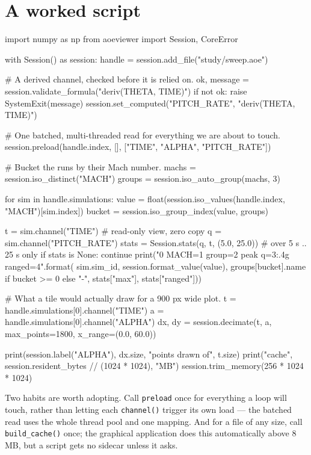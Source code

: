 \documentclass[11pt,a4paper,oneside]{report}
\newcommand{\code}[1]{\texttt{#1}}
\begin{document}
\section{A worked script}

\begin{aoecode}
import numpy as np
from aoeviewer import Session, CoreError

with Session() as session:
    handle = session.add_file("study/sweep.aoe")

    # A derived channel, checked before it is relied on.
    ok, message = session.validate_formula("deriv(THETA, TIME)")
    if not ok:
        raise SystemExit(message)
    session.set_computed("PITCH_RATE", "deriv(THETA, TIME)")

    # One batched, multi-threaded read for everything we are about to touch.
    session.preload(handle.index, [], ["TIME", "ALPHA", "PITCH_RATE"])

    # Bucket the runs by their Mach number.
    machs = session.iso_distinct("MACH")
    groups = session.iso_auto_group(machs, 3)

    for sim in handle.simulations:
        value = float(session.iso_values(handle.index, "MACH")[sim.index])
        bucket = session.iso_group_index(value, groups)

        t = sim.channel("TIME")           # read-only view, zero copy
        q = sim.channel("PITCH_RATE")
        stats = Session.stats(q, t, (5.0, 25.0))   # over 5 s .. 25 s only
        if stats is None:
            continue
        print("{0} MACH={1} group={2} peak q={3:.4g} ranged={4}".format(
            sim.sim_id, session.format_value(value),
            groups[bucket].name if bucket >= 0 else "-",
            stats["max"], stats["ranged"]))

    # What a tile would actually draw for a 900 px wide plot.
    t = handle.simulations[0].channel("TIME")
    a = handle.simulations[0].channel("ALPHA")
    dx, dy = session.decimate(t, a, max_points=1800, x_range=(0.0, 60.0))

    print(session.label("ALPHA"), dx.size, "points drawn of", t.size)
    print("cache", session.resident_bytes // (1024 * 1024), "MB")
    session.trim_memory(256 * 1024 * 1024)
\end{aoecode}

Two habits are worth adopting. Call \code{preload} once for everything a loop
will touch, rather than letting each \code{channel()} trigger its own load ---
the batched read uses the whole thread pool and one mapping. And for a file of
any size, call \code{build\_cache()} once; the graphical application does this
automatically above 8\,MB, but a script gets no sidecar unless it asks.
\end{document}
